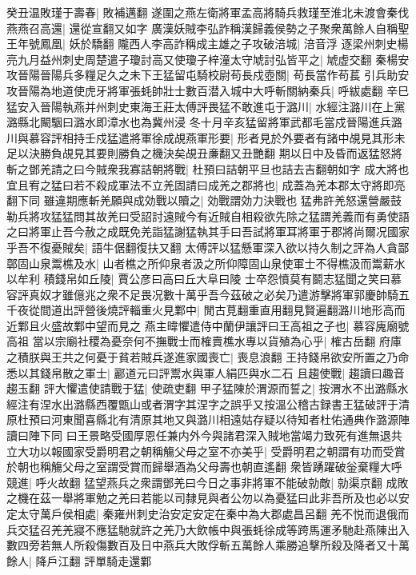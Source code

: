 癸丑温敗瑾于壽春|{
	敗補邁翻}
遂圍之燕左衛將軍孟高將騎兵救瑾至淮北未渡會秦伐燕燕召高還|{
	還從宣翻又如字}
廣漢妖賊李弘詐稱漢歸義侯勢之子聚衆萬餘人自稱聖王年號鳳凰|{
	妖於驕翻}
隴西人李高詐稱成主雄之子攻破涪城|{
	涪音浮}
逐梁州刺史楊亮九月益州刺史周楚遣子瓊討高又使瓊子梓潼太守虓討弘皆平之|{
	虓虚交翻}
秦楊安攻晉陽晉陽兵多糧足久之未下王猛留屯騎校尉苟長戍壺關|{
	苟長當作苟萇}
引兵助安攻晉陽為地道使虎牙將軍張蚝帥壯士數百潜入城中大呼斬關納秦兵|{
	呼紱處翻}
辛巳猛安入晉陽執燕并州刺史東海王莊太傅評畏猛不敢進屯于潞川|{
	水經注潞川在上黨潞縣北闞駰曰潞水即漳水也為冀州浸}
冬十月辛亥猛留將軍武都毛當戍晉陽進兵潞川與慕容評相持壬戍猛遣將軍徐成覘燕軍形要|{
	形者見於外要者有諸中覘見其形未足以決勝負覘見其要則勝負之機決矣覘丑亷翻又丑艷翻}
期以日中及昏而返猛怒將斬之鄧羌請之曰今賊衆我寡詰朝將戰|{
	杜預曰詰朝平旦也詰去吉翻朝如字}
成大將也宜且宥之猛曰若不殺成軍法不立羌固請曰成羌之郡將也|{
	成蓋為羌本郡太守將即亮翻下同}
雖違期應斬羌願與成効戰以贖之|{
	効戰謂効力決戰也}
猛弗許羌怒還營嚴鼓勒兵將攻猛猛問其故羌曰受詔討遠賊今有近賊自相殺欲先除之猛謂羌義而有勇使語之曰將軍止吾今赦之成既免羌詣猛謝猛執其手曰吾試將軍耳將軍于郡將尚爾况國家乎吾不復憂賊矣|{
	語牛倨翻復扶又翻}
太傅評以猛懸軍深入欲以持久制之評為人貪鄙鄣固山泉鬻樵及水|{
	山者樵之所仰泉者汲之所仰障固山泉使軍士不得樵汲而鬻薪水以牟利}
積錢帛如丘陵|{
	賈公彦曰高曰丘大阜曰陵}
士卒怨憤莫有鬬志猛聞之笑曰慕容評真奴才雖億兆之衆不足畏况數十萬乎吾今茲破之必矣乃遣游擊將軍郭慶帥騎五千夜從間道出評營後燒評輜重火見鄴中|{
	閒古莧翻重直用翻見賢遍翻潞川地形高而近鄴且火盛故鄴中望而見之}
燕主暐懼遣侍中蘭伊讓評曰王高祖之子也|{
	慕容廆廟號高祖}
當以宗廟社稷為憂奈何不撫戰士而榷賣樵水專以貨殖為心乎|{
	榷古岳翻}
府庫之積朕與王共之何憂于貧若賊兵遂進家國喪亡|{
	喪息浪翻}
王持錢帛欲安所置之乃命悉以其錢帛散之軍士|{
	酈道元曰評鬻水與軍人絹匹與水二石}
且趨使戰|{
	趨讀曰趣音趨玉翻}
評大懼遣使請戰于猛|{
	使疏吏翻}
甲子猛陳於渭源而誓之|{
	按渭水不出潞縣水經注有涅水出潞縣西覆甑山或者渭字其涅字之誤乎又按溫公稽古録書王猛破評于清原杜預曰河東聞喜縣北有清原其地又與潞川相遠姑存疑以待知者杜佑通典作潞源陣讀曰陣下同}
曰王景略受國厚恩任兼内外今與諸君深入賊地當竭力致死有進無退共立大功以報國家受爵明君之朝稱觴父母之室不亦美乎|{
	受爵明君之朝謂有功而受賞於朝也稱觴父母之室謂受賞而歸舉酒為父母壽也朝直遙翻}
衆皆踴躍破釡棄糧大呼競進|{
	呼火故翻}
猛望燕兵之衆謂鄧羌曰今日之事非將軍不能破勍敵|{
	勍渠京翻}
成敗之機在茲一舉將軍勉之羌曰若能以司隸見與者公勿以為憂猛曰此非吾所及也必以安定太守萬戶侯相處|{
	秦雍州刺史治安定安定在秦中為大郡處昌呂翻}
羌不悦而退俄而兵交猛召羌羌寢不應猛馳就許之羌乃大飲帳中與張蚝徐成等跨馬運矛馳赴燕陳出入數四旁若無人所殺傷數百及日中燕兵大敗俘斬五萬餘人乘勝追擊所殺及降者又十萬餘人|{
	降戶江翻}
評單騎走還鄴

